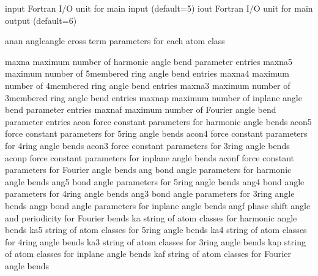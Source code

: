 \documentclass[letterpaper,11pt,english]{sphinxmanual}
\begin{document}
\sphinxAtStartPar
{}

\begin{sphinxVerbatim}[commandchars=\\\{\}]
input           Fortran I/O unit for main input (default=5)
iout            Fortran I/O unit for main output (default=6)
\end{sphinxVerbatim}

\sphinxAtStartPar
{}

\begin{sphinxVerbatim}[commandchars=\\\{\}]
anan            angle\PYGZhy{}angle cross term parameters for each atom class
\end{sphinxVerbatim}

\sphinxAtStartPar
{}

\begin{sphinxVerbatim}[commandchars=\\\{\}]
maxna           maximum number of harmonic angle bend parameter entries
maxna5          maximum number of 5\PYGZhy{}membered ring angle bend entries
maxna4          maximum number of 4\PYGZhy{}membered ring angle bend entries
maxna3          maximum number of 3\PYGZhy{}membered ring angle bend entries
maxnap          maximum number of in\PYGZhy{}plane angle bend parameter entries
maxnaf          maximum number of Fourier angle bend parameter entries
acon            force constant parameters for harmonic angle bends
acon5           force constant parameters for 5\PYGZhy{}ring angle bends
acon4           force constant parameters for 4\PYGZhy{}ring angle bends
acon3           force constant parameters for 3\PYGZhy{}ring angle bends
aconp           force constant parameters for in\PYGZhy{}plane angle bends
aconf           force constant parameters for Fourier angle bends
ang             bond angle parameters for harmonic angle bends
ang5            bond angle parameters for 5\PYGZhy{}ring angle bends
ang4            bond angle parameters for 4\PYGZhy{}ring angle bends
ang3            bond angle parameters for 3\PYGZhy{}ring angle bends
angp            bond angle parameters for in\PYGZhy{}plane angle bends
angf            phase shift angle and periodicity for Fourier bends
ka              string of atom classes for harmonic angle bends
ka5             string of atom classes for 5\PYGZhy{}ring angle bends
ka4             string of atom classes for 4\PYGZhy{}ring angle bends
ka3             string of atom classes for 3\PYGZhy{}ring angle bends
kap             string of atom classes for in\PYGZhy{}plane angle bends
kaf             string of atom classes for Fourier angle bends
\end{sphinxVerbatim}
\end{document}
